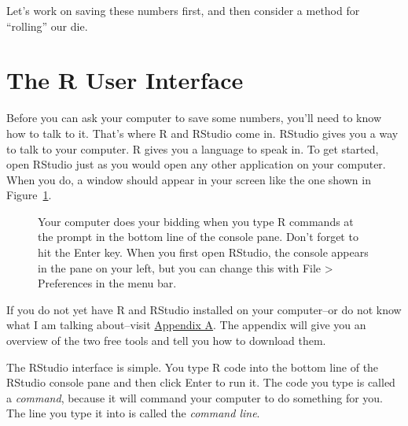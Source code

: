 \documentclass[
  letterpaper,
  DIV=11,
  numbers=noendperiod]{scrbook}
\makeatletter
\newcommand*\pandocbounded[1]{%
  \sbox\pandoc@box{#1}%
  \Gscale@div\@tempa{\textheight}{\dimexpr\ht\pandoc@box+\dp\pandoc@box\relax}%
  \Gscale@div\@tempb{\linewidth}{\wd\pandoc@box}%
  \ifdim\@tempb\p@<\@tempa\p@\let\@tempa\@tempb\fi%
  \ifdim\@tempa\p@<\p@\scalebox{\@tempa}{\usebox\pandoc@box}%
  \else\usebox{\pandoc@box}%
  \fi%
}
\makeatother
\begin{document}
Let's work on saving these numbers first, and then consider a method for
``rolling'' our die.

\section{The R User Interface}\label{the-r-user-interface}

Before you can ask your computer to save some numbers, you'll need to
know how to talk to it. That's where R and RStudio come in. RStudio
gives you a way to talk to your computer. R gives you a language to
speak in. To get started, open RStudio just as you would open any other
application on your computer. When you do, a window should appear in
your screen like the one shown in Figure~\ref{fig-console}.

\begin{figure}

\centering{

\pandocbounded{\texttt{[image: images/hopr\_0101.png]}}

}

\caption{\label{fig-console}Your computer does your bidding when you
type R commands at the prompt in the bottom line of the console pane.
Don't forget to hit the Enter key. When you first open RStudio, the
console appears in the pane on your left, but you can change this with
File \textgreater{} Preferences in the menu bar.}

\end{figure}%

\begin{tcolorbox}[enhanced jigsaw, breakable, colback=white, colbacktitle=quarto-callout-note-color!10!white, arc=.35mm, bottomrule=.15mm, coltitle=black, left=2mm, rightrule=.15mm, colframe=quarto-callout-note-color-frame, leftrule=.75mm, opacitybacktitle=0.6, bottomtitle=1mm, toptitle=1mm, titlerule=0mm, opacityback=0, title=\textcolor{quarto-callout-note-color}{\faInfo}\hspace{0.5em}{Note}, toprule=.15mm]

If you do not yet have R and RStudio installed on your computer--or do
not know what I am talking about--visit \hyperref[starting]{Appendix A}.
The appendix will give you an overview of the two free tools and tell
you how to download them.

\end{tcolorbox}

The RStudio interface is simple. You type R code into the bottom line of
the RStudio console pane and then click Enter to run it. The code you
type is called a \emph{command}, because it will command your computer
to do something for you. The line you type it into is called the
\emph{command line}.
\end{document}
